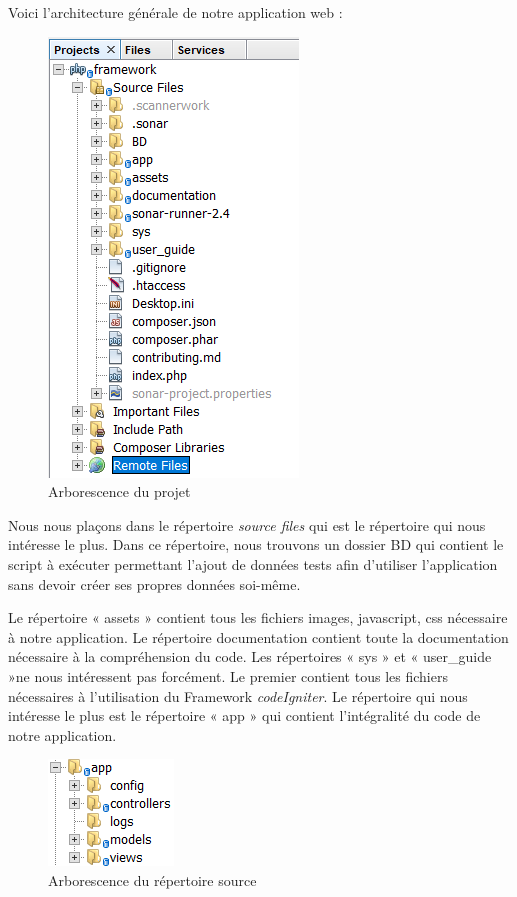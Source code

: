 \documentclass[noposter]{polytech/polytech}
\begin{document}
Voici l'architecture générale de notre application web : 

\begin{figure}
	\includegraphics[scale=1]{images/arboProjet}
	\caption{Arborescence du projet}
	\label{fig:arboProjet}
\end{figure}

Nous nous plaçons dans le répertoire \textit{source files} qui est le répertoire qui nous intéresse le plus. Dans ce répertoire, nous trouvons un dossier BD qui contient le script à exécuter permettant l'ajout de données tests afin d'utiliser l'application sans devoir créer ses propres données soi-même.
 
Le répertoire « assets » contient tous les fichiers images, javascript, css nécessaire à notre application. Le répertoire documentation contient toute la documentation nécessaire à la compréhension du
code. Les répertoires « sys » et « user\_guide »ne nous intéressent pas forcément. Le premier contient tous les fichiers nécessaires à l'utilisation du Framework \textit{codeIgniter}. Le répertoire qui nous intéresse le plus est le répertoire « app » qui contient l'intégralité du code de notre application. 

\begin{figure}
	\includegraphics[scale=1]{images/arboMVC}
	\caption{Arborescence du répertoire source}
	\label{fig:arboSource}
\end{figure}
\end{document}
